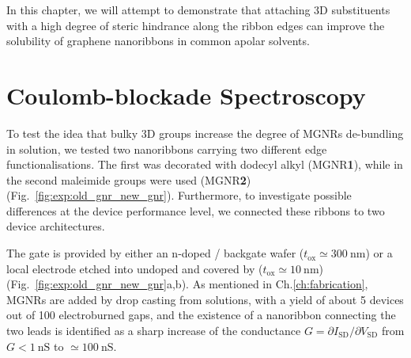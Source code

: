In this chapter, we will attempt to demonstrate that attaching 3D substituents with a high degree of steric hindrance along the ribbon edges can improve the solubility of graphene nanoribbons in common apolar solvents.

\section{Coulomb-blockade Spectroscopy}\label{solubility:sec:transport}

To test the idea that bulky 3D groups increase the degree of \glspl{MGNR} de-bundling in solution, we tested two nanoribbons carrying two different edge functionalisations. The first was decorated with dodecyl alkyl (\gls{MGNR}\textbf{1}), while in the second  maleimide  groups were used (\gls{MGNR}\textbf{2}) (Fig.~\ref{fig:exp:old_gnr_new_gnr}). Furthermore, to investigate possible differences at the device performance level, we connected these ribbons to two device architectures.

The gate is provided by either an n-doped / backgate wafer ($t_\textrm{ox}\simeq\SI{300}{\nano\metre}$) or a local  electrode etched into undoped  and covered by  ($t_\textrm{ox}\simeq\SI{10}{\nano\metre}$) (Fig.~\ref{fig:exp:old_gnr_new_gnr}a,b). As mentioned in Ch.\ref{ch:fabrication}, \glspl{MGNR} are added by drop casting from solutions, with a yield of about 5 devices out of 100 electroburned gaps, and the existence of a nanoribbon connecting the two leads is identified as a sharp increase of the conductance $G=\partial I_{\mathrm{SD}} / \partial V_{\mathrm{SD}}$ from $G<\SI{1}{\nano\siemens}$ to $\simeq \SI{100}{\nano\siemens}$.

